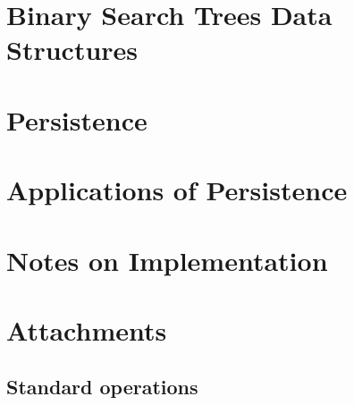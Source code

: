 \documentclass[12pt,a4paper]{report}
\let\openright=\clearpage
\begin{document}


\tableofcontents



\chapter{Binary Search Trees Data Structures}









\chapter{Persistence}



\chapter{Applications of Persistence}



\chapter{Notes on Implementation}







\appendix
\chapter{Attachments}

\section{Standard operations}



\openright
\end{document}
